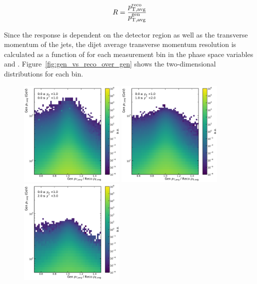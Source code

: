 \begin{equation}
    R = \frac{p_{\mathrm{T,avg}}^{\text{reco}}}{p_{\mathrm{T,avg}}^{\text{gen}}}
\end{equation}

Since the response is dependent on the detector region as well as the transverse
momentum of the jets, the dijet average transverse momentum resolution is
calculated as a function of \ptavggen for each measurement bin in the phase
space variables \ystar and \yboost. Figure~\ref{fig:gen_vs_reco_over_gen} shows the
two-dimensional distributions for each bin.

\begin{figure}[htbp]
    \centering
    \includegraphics[width=0.45\textwidth]{figures/measurement/gen_vs_reco_vs_gen_ptavg_yb0ys0.pdf}\hfill
    \includegraphics[width=0.45\textwidth]{figures/measurement/gen_vs_reco_vs_gen_ptavg_yb0ys1.pdf}
    \includegraphics[width=0.45\textwidth]{figures/measurement/gen_vs_reco_vs_gen_ptavg_yb0ys2.pdf}\hfill

\end{figure}
